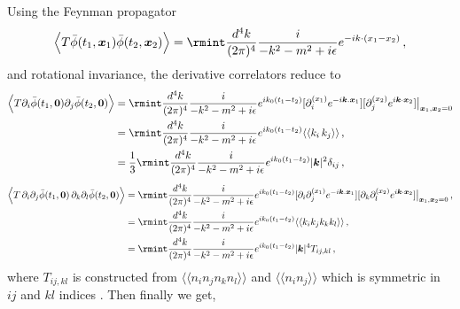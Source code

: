 Using the Feynman propagator
\begin{align}
    \begin{split}
        \Big\langle T \Bar{\phi}(t_1,\boldsymbol{x}_1)\Bar{\phi}(t_2,\boldsymbol{x}_2)\Big\rangle=\rmint \frac{d^4k}{(2\pi)^4}\frac{i}{-k^2-m^2+i\epsilon}e^{-ik\cdot(x_1-x_2)}\,,\label{4.13}
    \end{split}
\end{align}
and rotational invariance, the derivative correlators reduce to
\begin{align}
    \begin{split}
        \Big\langle T \partial_i \Bar{\phi}(t_1,\boldsymbol{0})\partial_j \Bar{\phi}(t_2,\boldsymbol{0})\Big\rangle&=\rmint \frac{d^4k}{(2\pi)^4}\frac{i}{-k^2-m^2+i\epsilon}e^{ik_0(t_1-t_2)}[\partial_{i}^{(x_1)}e^{-i\boldsymbol{k}.\boldsymbol{x}_1}][\partial_{j}^{(x_2)}e^{i\boldsymbol{k}\cdot\boldsymbol{x}_2}]\big|_{\boldsymbol{x}_1,\boldsymbol{x}_2=0}\\ &
        =\rmint \frac{d^4k}{(2\pi)^4}\frac{i}{-k^2-m^2+i\epsilon}e^{ik_0(t_1-t_2)}\langle\langle k_{i}\,k_{j}\rangle\rangle\,,\\ &
        =\frac{1}{3}\rmint \frac{d^4k}{(2\pi)^4}\frac{i}{-k^2-m^2+i\epsilon}e^{ik_0(t_1-t_2)}|\boldsymbol{k}|^2\delta_{ij}\,,\label{4.14}
    \end{split}
\end{align}
\begin{align}
    \begin{split}
          \Big\langle T \,\partial_i\partial_j \Bar{\phi}(t_1,\boldsymbol{0})\,\partial_k\partial_l \Bar{\phi}(t_2,\boldsymbol{0})\Big\rangle&=\rmint \frac{d^4k}{(2\pi)^4}\frac{i}{-k^2-m^2+i\epsilon}e^{ik_0(t_1-t_2)}[\partial_{i}\partial_j^{(x_1)}e^{-i\boldsymbol{k}.\boldsymbol{x}_1}][\partial_{k}\partial_l^{(x_2)}e^{i\boldsymbol{k}\cdot\boldsymbol{x}_2}]\big|_{\boldsymbol{x}_1,\boldsymbol{x}_2=0}\,,\\ &
          =\rmint \frac{d^4k}{(2\pi)^4}\frac{i}{-k^2-m^2+i\epsilon}e^{ik_0(t_1-t_2)}\langle\langle k_ik_jk_kk_l\rangle\rangle\,,\\ &
          =\rmint \frac{d^4k}{(2\pi)^4}\frac{i}{-k^2-m^2+i\epsilon}e^{ik_0(t_1-t_2)}|\boldsymbol{k}|^4 T_{ij,kl}\,,\label{4.15}
    \end{split}
\end{align}
where $T_{ij,kl}$ is constructed from $\langle\langle n_in_jn_kn_l\rangle\rangle$ and $\langle\langle n_in_j \rangle\rangle$ which is symmetric in $ij$ and $kl$ indices \cite{poissonwill}. Then finally we get, 
